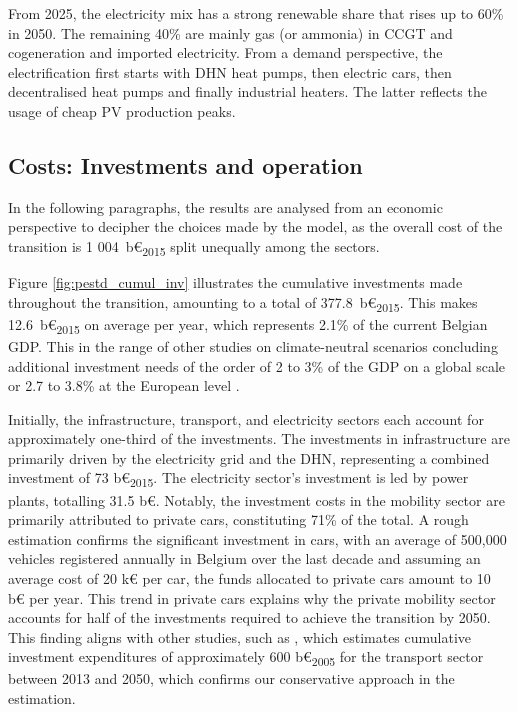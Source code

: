 From 2025, the electricity mix has a strong renewable share that rises up to 60\% in 2050. The remaining 40\% are mainly gas (or ammonia) in \gls{CCGT} and cogeneration and imported electricity. From a demand perspective, the electrification first starts with \gls{DHN} heat pumps, then electric cars, then decentralised heat pumps and finally industrial heaters. The latter reflects the usage of cheap \gls{PV} production peaks. 

\subsection{Costs: Investments and operation}

In the following paragraphs, the results are analysed from an economic perspective to decipher the choices made by the model, as the overall cost of the transition is 1 004~b€\textsubscript{2015} split unequally among the sectors. 

Figure \ref{fig:pestd_cumul_inv} illustrates the cumulative investments made throughout the transition, amounting to a total of 377.8~b€\textsubscript{2015}. This makes 12.6~b€\textsubscript{2015} on average per year, which represents 2.1\% of the current Belgian \gls{GDP}. This in the range of other studies on climate-neutral scenarios concluding additional investment needs of the order of 2 to 3\% of the \gls{GDP} on a global scale \cite{IEA2021,IRENA2021} or 2.7 to 3.8\% at the European level \cite{Widuto2023}.

Initially, the infrastructure, transport, and electricity sectors each account for approximately one-third of the investments. The investments in infrastructure are primarily driven by the electricity grid and the \acrfull{DHN}, representing a combined investment of 73 b€\textsubscript{2015}. The electricity sector's investment is led by power plants, totalling 31.5 b€. Notably, the investment costs in the mobility sector are primarily attributed to private cars, constituting 71\% of the total. A rough estimation confirms the significant investment in cars, with an average of 500,000 vehicles registered annually in Belgium over the last decade \cite{febiac2021datadigest} and assuming an average cost of 20 k€ per car, the funds allocated to private cars amount to 10 b€ per year. This trend in private cars explains why the private mobility sector accounts for half of the investments required to achieve the transition by 2050. This finding aligns with other studies, such as \citet{Devogelaer2013}, which estimates cumulative investment expenditures of approximately 600 b€\textsubscript{2005} for the transport sector between 2013 and 2050, which confirms our conservative approach in the estimation.


